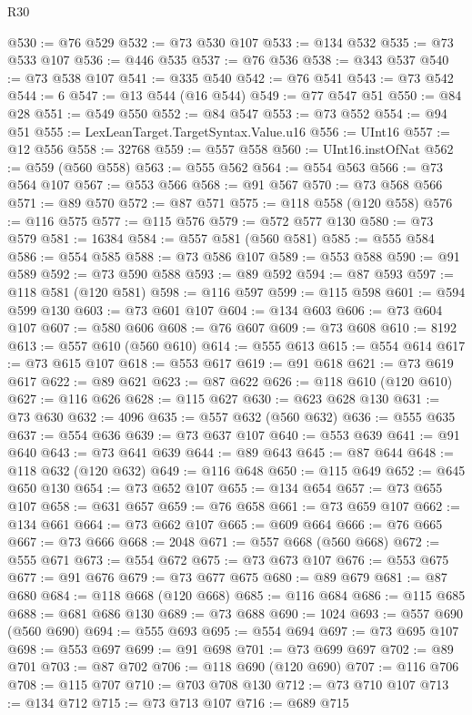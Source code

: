 \begin{lexlean}{R30}
\begin{coremodule}
@530 := @76 @529
@532 := @73 @530 @107
@533 := @134 @532
@535 := @73 @533 @107
@536 := @446 @535
@537 := @76 @536
@538 := @343 @537
@540 := @73 @538 @107
@541 := @335 @540
@542 := @76 @541
@543 := @73 @542
@544 := 6
@547 := @13 @544 (@16 @544)
@549 := @77 @547 @51
@550 := @84 @28
@551 := @549 @550
@552 := @84 @547
@553 := @73 @552
@554 := @94 @51
@555 := LexLeanTarget.TargetSyntax.Value.u16
@556 := UInt16
@557 := @12 @556
@558 := 32768
@559 := @557 @558
@560 := UInt16.instOfNat
@562 := @559 (@560 @558)
@563 := @555 @562
@564 := @554 @563
@566 := @73 @564 @107
@567 := @553 @566
@568 := @91 @567
@570 := @73 @568 @566
@571 := @89 @570
@572 := @87 @571
@575 := @118 @558 (@120 @558)
@576 := @116 @575
@577 := @115 @576
@579 := @572 @577 @130
@580 := @73 @579
@581 := 16384
@584 := @557 @581 (@560 @581)
@585 := @555 @584
@586 := @554 @585
@588 := @73 @586 @107
@589 := @553 @588
@590 := @91 @589
@592 := @73 @590 @588
@593 := @89 @592
@594 := @87 @593
@597 := @118 @581 (@120 @581)
@598 := @116 @597
@599 := @115 @598
@601 := @594 @599 @130
@603 := @73 @601 @107
@604 := @134 @603
@606 := @73 @604 @107
@607 := @580 @606
@608 := @76 @607
@609 := @73 @608
@610 := 8192
@613 := @557 @610 (@560 @610)
@614 := @555 @613
@615 := @554 @614
@617 := @73 @615 @107
@618 := @553 @617
@619 := @91 @618
@621 := @73 @619 @617
@622 := @89 @621
@623 := @87 @622
@626 := @118 @610 (@120 @610)
@627 := @116 @626
@628 := @115 @627
@630 := @623 @628 @130
@631 := @73 @630
@632 := 4096
@635 := @557 @632 (@560 @632)
@636 := @555 @635
@637 := @554 @636
@639 := @73 @637 @107
@640 := @553 @639
@641 := @91 @640
@643 := @73 @641 @639
@644 := @89 @643
@645 := @87 @644
@648 := @118 @632 (@120 @632)
@649 := @116 @648
@650 := @115 @649
@652 := @645 @650 @130
@654 := @73 @652 @107
@655 := @134 @654
@657 := @73 @655 @107
@658 := @631 @657
@659 := @76 @658
@661 := @73 @659 @107
@662 := @134 @661
@664 := @73 @662 @107
@665 := @609 @664
@666 := @76 @665
@667 := @73 @666
@668 := 2048
@671 := @557 @668 (@560 @668)
@672 := @555 @671
@673 := @554 @672
@675 := @73 @673 @107
@676 := @553 @675
@677 := @91 @676
@679 := @73 @677 @675
@680 := @89 @679
@681 := @87 @680
@684 := @118 @668 (@120 @668)
@685 := @116 @684
@686 := @115 @685
@688 := @681 @686 @130
@689 := @73 @688
@690 := 1024
@693 := @557 @690 (@560 @690)
@694 := @555 @693
@695 := @554 @694
@697 := @73 @695 @107
@698 := @553 @697
@699 := @91 @698
@701 := @73 @699 @697
@702 := @89 @701
@703 := @87 @702
@706 := @118 @690 (@120 @690)
@707 := @116 @706
@708 := @115 @707
@710 := @703 @708 @130
@712 := @73 @710 @107
@713 := @134 @712
@715 := @73 @713 @107
@716 := @689 @715

\end{coremodule}
\end{lexlean}
